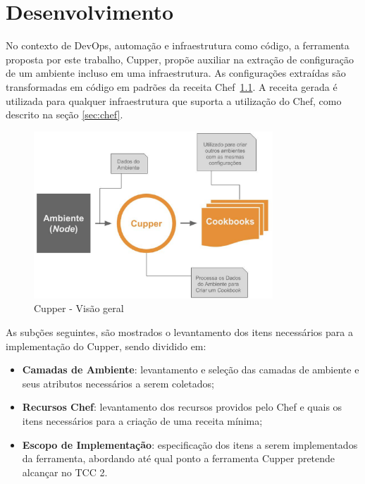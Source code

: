 \chapter{Desenvolvimento}
\label{chap:desenv}

No contexto de DevOps, automação e infraestrutura como código, a ferramenta
proposta por este trabalho, Cupper, propõe auxiliar na extração de configuração
de um ambiente incluso em uma infraestrutura. As configurações extraídas são
transformadas em código em padrões da receita Chef~\ref{fig:cupper_geral}. A
receita gerada é utilizada para qualquer infraestrutura que suporta a
utilização do Chef, como descrito na seção \ref{sec:chef}.

\begin{figure}[h]
  \centering
  \includegraphics[width=0.8\textwidth]{figuras/cupper_geral.eps}
  \caption{Cupper - Visão geral}
  \label{fig:cupper_geral}
\end{figure}

As subções seguintes, são mostrados o levantamento dos itens necessários para
a implementação do Cupper, sendo dividido em:

\begin{itemize}
  \item \textbf{Camadas de Ambiente}: levantamento e seleção das camadas de ambiente
    e seus atributos necessários a serem coletados;
  \item \textbf{Recursos Chef}: levantamento dos recursos providos pelo Chef e quais os
    itens necessários para a criação de uma receita mínima;
  \item \textbf{Escopo de Implementação}: especificação dos itens a serem implementados
    da ferramenta, abordando até qual ponto a ferramenta Cupper pretende alcançar
    no TCC 2.
\end{itemize}




